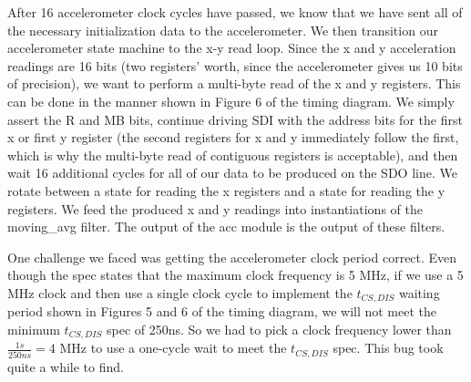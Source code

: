 \documentclass{article}
\begin{document}
After 16 accelerometer clock cycles have passed, we know that we have sent all of the necessary initialization data to the accelerometer.
We then transition our accelerometer state machine to the x-y read loop.
Since the x and y acceleration readings are 16 bits (two registers' worth, since the accelerometer gives us 10 bits of precision),
we want to perform a multi-byte read of the x and y registers.
This can be done in the manner shown in Figure 6 of the timing diagram.
We simply assert the R and MB bits, continue driving SDI with the address bits for the first x or first y register (the second registers for x and y immediately follow the first, which is why the multi-byte read of contiguous registers is acceptable),
and then wait 16 additional cycles for all of our data to be produced on the SDO line.
We rotate between a state for reading the x registers and a state for reading the y registers.
We feed the produced x and y readings into instantiations of the moving\_avg filter.
The output of the acc module is the output of these filters.

One challenge we faced was getting the accelerometer clock period correct.
Even though the spec states that the maximum clock frequency is 5 MHz,
if we use a 5 MHz clock and then use a single clock cycle to implement the $t_{CS,DIS}$ waiting period shown in Figures 5 and 6 of the timing diagram,
we will not meet the minimum $t_{CS,DIS}$ spec of 250ns.
So we had to pick a clock frequency lower than $\frac{1s}{250ns} = 4$ MHz to use a one-cycle wait to meet the $t_{CS,DIS}$ spec.
This bug took quite a while to find.
\end{document}
